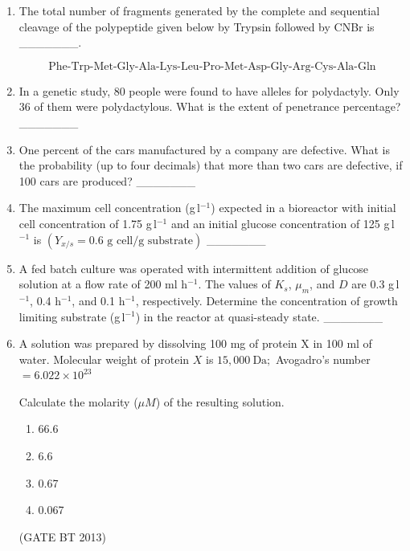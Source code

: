 \documentclass[journal,12pt,onecolumn]{IEEEtran}
\theoremstyle{remark}
\begin{document}
\begin{enumerate}
\item 

The total number of fragments generated by the complete and sequential cleavage of the polypeptide given below by Trypsin followed by CNBr is \_\_\_\_\_\_\_.

\[
\text{Phe-Trp-Met-Gly-Ala-Lys-Leu-Pro-Met-Asp-Gly-Arg-Cys-Ala-Gln}
\]
\item 

In a genetic study, 80 people were found to have alleles for polydactyly. Only 36 of them were polydactylous. What is the extent of penetrance percentage? \_\_\_\_\_\_\_

\item 

One percent of the cars manufactured by a company are defective. What is the probability (up to four decimals) that more than two cars are defective, if 100 cars are produced? \_\_\_\_\_\_\_

\item 

The maximum cell concentration (g\,l\(^{-1}\)) expected in a bioreactor with initial cell concentration of 1.75 g\,l\(^{-1}\) and an initial glucose concentration of 125 g\,l\(^{-1}\) is \(\left(Y_{x/s} = 0.6 \text{ g cell/g substrate}\right)\) \_\_\_\_\_\_\_

\item 

A fed batch culture was operated with intermittent addition of glucose solution at a flow rate of 200 ml h\(^{-1}\). The values of \(K_s\), \(\mu_m\), and \(D\) are 0.3 g\,l\(^{-1}\), 0.4 h\(^{-1}\), and 0.1 h\(^{-1}\), respectively. Determine the concentration of growth limiting substrate (g\,l\(^{-1}\)) in the reactor at quasi-steady state. \_\_\_\_\_\_\_
\item 

A solution was prepared by dissolving 100 mg of protein X in 100 ml of water.  
Molecular weight of protein \(X\) is \(15{,}000\ \mathrm{Da};\) Avogadro's number \(= 6.022 \times 10^{23}\)

Calculate the molarity (\(\mu M\)) of the resulting solution.

\begin{enumerate}
    \item 66.6
    \item 6.6
    \item 0.67
    \item 0.067
\end{enumerate} \hfill(GATE BT 2013)


\end{enumerate}
\end{document}
